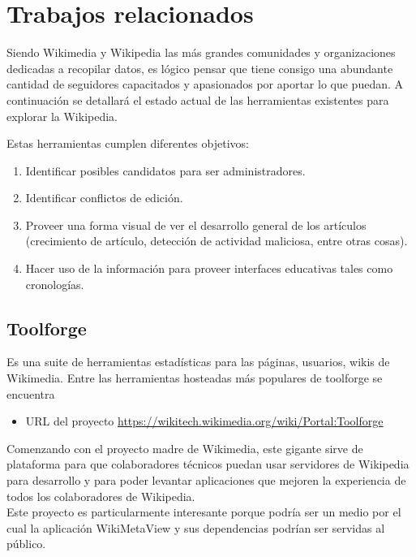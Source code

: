 \section{Trabajos relacionados}

Siendo Wikimedia y Wikipedia las más grandes comunidades y organizaciones dedicadas a recopilar datos, es lógico pensar que tiene consigo una abundante cantidad de seguidores capacitados y apasionados por aportar lo que puedan. A continuación se detallará el estado actual de las herramientas existentes para explorar la Wikipedia.

Estas herramientas cumplen diferentes objetivos:

\begin{enumerate}
    \item Identificar posibles candidatos para ser administradores.
    \item Identificar conflictos de edición.
    \item Proveer una forma visual de ver el desarrollo general de los artículos (crecimiento de artículo, detección de actividad maliciosa, entre otras cosas).
    \item Hacer uso de la información para proveer interfaces educativas tales como cronologías.
\end{enumerate}


\subsection{Toolforge}

Es una suite de herramientas estadísticas para las páginas, usuarios, wikis de Wikimedia. Entre las herramientas hosteadas más populares de toolforge se encuentra 

\begin{itemize}
    \item URL del proyecto \url{https://wikitech.wikimedia.org/wiki/Portal:Toolforge}
\end{itemize}

Comenzando con el proyecto madre de Wikimedia, este gigante sirve de plataforma para que colaboradores técnicos puedan usar servidores de Wikipedia para desarrollo y para poder levantar aplicaciones que mejoren la experiencia de todos los colaboradores de Wikipedia.
\\
Este proyecto es particularmente interesante porque podría ser un medio por el cual la aplicación WikiMetaView y sus dependencias podrían ser servidas al público.

